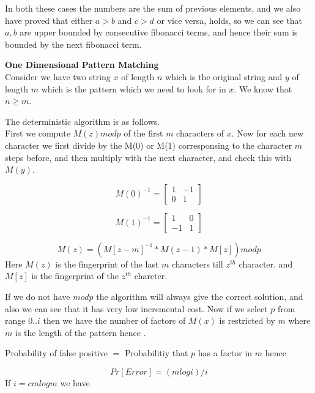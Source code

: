 \documentclass{assignment}
\begin{document}
\begin{problemlist}
\begin{problem}
\begin{answer}
\begin{enumerate}
\begin{enumerate}
In both these cases the numbers are the sum of previous elements, and we also have proved that either $a>b$ and $c>d$ or vice versa, holds, so we can see that $a,b$ are upper bounded by consecutive fibonacci terms, and hence their sum is bounded by the next fibonacci term. 
\end{enumerate}
\end{enumerate}

\textbf{One Dimensional Pattern Matching} \\
 Consider we have two string $x$ of length $n$ which is the original string and $y$ of length $m$ which is the pattern which we need to look for in $x$. We know that $n \geq m$. 

The deterministic algorithm is as follows. \\
First we compute $M(z) mod p$ of the first $m$ characters of $x$. Now for each new character we first divide by the M(0) or M(1) corresponsing to the character $m$ steps before, and then multiply with the next character, and check this with $M(y)$. 

\begin{equation}
M(0)^{-1} = 
\begin{bmatrix}
 1 & -1 \\
 0 & 1 
\end{bmatrix}
\end{equation}


\begin{equation}
M(1)^{-1} = 
\begin{bmatrix}
 1 & 0 \\
 -1 & 1 
\end{bmatrix}
\end{equation}

\begin{equation}
M(z)= (M[z-m]^{-1} * M(z-1) * M[z] ) mod p
\end{equation}
Here $M(z)$ is the fingerprint of the last $m$ characters till $z^{th}$ character. and $M[z]$ is the fingerprint of the $z^{th}$ charcter. 

If we do not have $mod p$ the algorithm will always give the correct solution, and also we can see that it has very low incremental cost. Now if we select $p$ from range $0..i$ then we have the number of factors of $M(x)$ is restricted by $m$  where $m$ is the length of the pattern hence . 

Probability of false positive $=$ Probabilitiy that $p$ has a factor in $m$ hence 

\begin{equation}
 Pr[Error] =(m log i) /i 
\end{equation}
If $i=cmlogm$ we have 


\end{answer}
\end{problem}
\end{problemlist}
\end{document}
